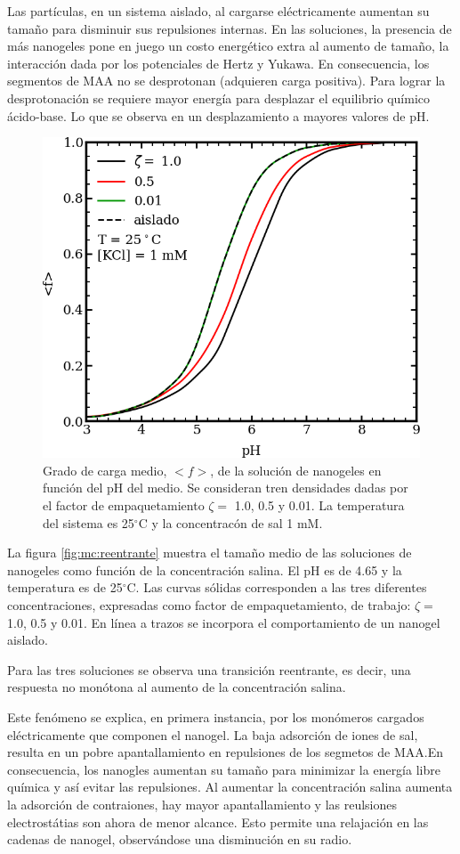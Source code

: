 	Las part\'iculas, en un sistema aislado, al cargarse el\'ectricamente aumentan su tama\~no para disminuir sus repulsiones internas. En las soluciones, la presencia de m\'as nanogeles pone en juego un costo energ\'etico extra al aumento de tama\~no, la interacci\'on dada por los potenciales de Hertz y Yukawa. En consecuencia, los segmentos de MAA no se desprotonan (adquieren carga positiva). Para lograr la desprotonaci\'on se requiere mayor energ\'ia para desplazar el equilibrio qu\'imico \'acido-base. Lo que se observa en un desplazamiento a mayores valores de pH.
	
	\begin{figure}
		\centering
		\includegraphics[width=0.45\linewidth]{Figures/graph-mc/fvspH.png}
		\caption{Grado de carga medio, $<f>$, de la soluci\'on de nanogeles en funci\'on del pH del medio. Se consideran tren densidades dadas por el factor de empaquetamiento $\zeta =$ 1.0, 0.5 y 0.01. La temperatura del sistema es 25$^\circ$C y la concentrac\'on de sal 1 mM.}
		\label{fig:mc:fvspH}
	\end{figure}
	
	
	La figura \ref{fig:mc:reentrante} muestra el tama\~no medio de las soluciones de nanogeles como funci\'on de la concentraci\'on salina. El pH es de 4.65 y la temperatura es de 25$^\circ$C. Las curvas s\'olidas corresponden a las tres diferentes concentraciones, expresadas como factor de empaquetamiento, de trabajo: $\zeta =$ 1.0, 0.5 y 0.01. En l\'inea a trazos se incorpora el comportamiento de un nanogel aislado.
	
	Para las tres soluciones se observa una transici\'on reentrante, es decir, una respuesta no mon\'otona al aumento de la concentraci\'on salina.
	
	Este fen\'omeno se explica, en primera instancia, por los mon\'omeros cargados el\'ectricamente que componen el nanogel. La baja adsorci\'on de iones de sal, resulta en un pobre apantallamiento en repulsiones de los segmetos de MAA.En consecuencia, los nanogles aumentan su tama\~no para minimizar la energ\'ia libre qu\'imica y as\'i evitar las repulsiones. Al aumentar la concentraci\'on salina aumenta la adsorci\'on de contraiones, hay mayor apantallamiento y las reulsiones electrost\'atias son ahora de menor alcance. Esto permite una relajaci\'on en las cadenas de nanogel, observ\'andose una disminuci\'on en su radio.
	
